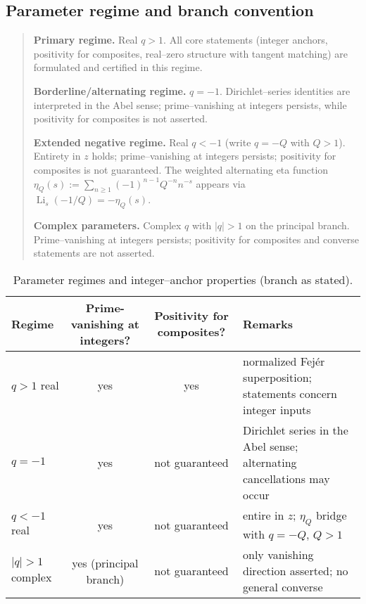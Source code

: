 \documentclass[11pt,a4paper]{amsart}
\theoremstyle{plain}
\theoremstyle{definition}
\theoremstyle{remark}
\begin{document}
\subsection*{Parameter regime and branch convention}\label{app:param-branch}
\begin{quote}
\textbf{Primary regime.} Real $q>1$. All core statements (integer anchors, positivity for composites, real–zero structure with tangent matching) are formulated and certified in this regime.

\textbf{Borderline/alternating regime.} $q=-1$. Dirichlet–series identities are interpreted in the Abel sense; prime–vanishing at integers persists, while positivity for composites is not asserted.

\textbf{Extended negative regime.} Real $q<-1$ (write $q=-Q$ with $Q>1$). Entirety in $z$ holds; prime–vanishing at integers persists; positivity for composites is not guaranteed. The weighted alternating eta function
$\eta_Q(s):=\sum_{n\ge1}(-1)^{n-1}Q^{-n}n^{-s}$ appears via $\operatorname{Li}_s(-1/Q)=-\eta_Q(s)$.

\textbf{Complex parameters.} Complex $q$ with $|q|>1$ on the principal branch. Prime–vanishing at integers persists; positivity for composites and converse statements are not asserted.
\end{quote}

\begin{table}[h!]
\centering
\small
\setlength{\tabcolsep}{4pt}
\begin{tabularx}{\linewidth}{@{}l c c X@{}}
\toprule
Regime & Prime-vanishing at integers? & Positivity for composites? & Remarks \\
\midrule
$q>1$ real      & yes & yes & normalized Fej\'er superposition; statements concern integer inputs \\
$q=-1$          & yes & not guaranteed & Dirichlet series in the Abel sense; alternating cancellations may occur \\
$q<-1$ real     & yes & not guaranteed & entire in $z$; $\eta_Q$ bridge with $q=-Q$, $Q>1$ \\
$|q|>1$ complex & yes (principal branch) & not guaranteed & only vanishing direction asserted; no general converse \\
\bottomrule
\end{tabularx}
\caption{Parameter regimes and integer–anchor properties (branch as stated).}
\label{tab:regimes}
\end{table}
\end{document}
